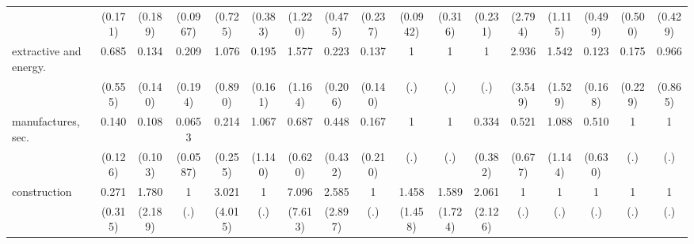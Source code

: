 {\begin{tabular}{l*{16}{c}}
                    &     (0.171)         &     (0.189)         &    (0.0967)         &     (0.725)         &     (0.383)         &     (1.220)         &     (0.475)         &     (0.237)         &    (0.0942)         &     (0.316)         &     (0.231)         &     (2.794)         &     (1.115)         &     (0.499)         &     (0.500)         &     (0.429)         \\
[1em]
extractive and energy.&       0.685         &       0.134         &       0.209         &       1.076         &       0.195\sym{*}  &       1.577         &       0.223         &       0.137         &           1         &           1         &           1         &       2.936         &       1.542         &       0.123         &       0.175         &       0.966         \\
                    &     (0.555)         &     (0.140)         &     (0.194)         &     (0.890)         &     (0.161)         &     (1.164)         &     (0.206)         &     (0.140)         &         (.)         &         (.)         &         (.)         &     (3.549)         &     (1.529)         &     (0.168)         &     (0.229)         &     (0.865)         \\
[1em]
manufactures, sec.  &       0.140\sym{*}  &       0.108\sym{*}  &      0.0653\sym{**} &       0.214         &       1.067         &       0.687         &       0.448         &       0.167         &           1         &           1         &       0.334         &       0.521         &       1.088         &       0.510         &           1         &           1         \\
                    &     (0.126)         &     (0.103)         &    (0.0587)         &     (0.255)         &     (1.140)         &     (0.620)         &     (0.432)         &     (0.210)         &         (.)         &         (.)         &     (0.382)         &     (0.677)         &     (1.144)         &     (0.630)         &         (.)         &         (.)         \\
[1em]
construction        &       0.271         &       1.780         &           1         &       3.021         &           1         &       7.096         &       2.585         &           1         &       1.458         &       1.589         &       2.061         &           1         &           1         &           1         &           1         &           1         \\
                    &     (0.315)         &     (2.189)         &         (.)         &     (4.015)         &         (.)         &     (7.613)         &     (2.897)         &         (.)         &     (1.458)         &     (1.724)         &     (2.126)         &         (.)         &         (.)         &         (.)         &         (.)         &         (.)         \\

\end{tabular}}
